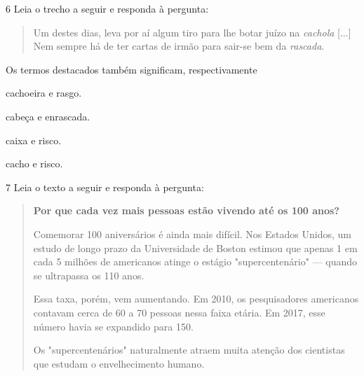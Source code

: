 \num{6} Leia o trecho a seguir e responda à pergunta:

\begin{quote}
Um destes dias, leva por aí algum tiro para lhe botar juízo na
\emph{cachola} {[}...{]} Nem sempre há de ter cartas de irmão para
sair-se bem da \emph{rascada}.

\end{quote}

Os termos destacados também significam, respectivamente

\begin{escolha}
\item cachoeira e rasgo.

\item cabeça e enrascada.

\item caixa e risco.

\item cacho e risco.
\end{escolha}


\num{7} Leia o texto a seguir e responda à pergunta:

\begin{quote}
\textbf{Por que cada vez mais pessoas estão vivendo até os 100 anos?}

Comemorar 100 aniversários é ainda mais difícil. Nos Estados Unidos,
um estudo de longo prazo da Universidade de Boston estimou que apenas 1
em cada 5 milhões de americanos atinge o estágio "supercentenário" ---
quando se ultrapassa os 110 anos.

Essa taxa, porém, vem aumentando. Em 2010, os pesquisadores americanos
contavam cerca de 60 a 70 pessoas nessa faixa etária. Em 2017, esse
número havia se expandido para 150.

Os "supercentenários" naturalmente atraem muita atenção dos cientistas
que estudam o envelhecimento humano.

\end{quote}

